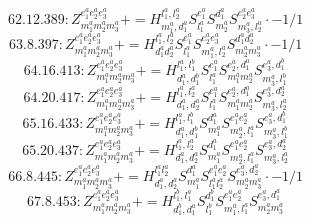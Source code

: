 \documentclass[letterpaper,10pt,fleqn,leqno,onecolumn]{article}
\begin{document}
\begin{equation} \;\;\;\;\;\;  62.12.389: Z^{e_{1}^{a}e_{2}^{a}e_{3}^{a}}_{m_{1}^{a}m_{2}^{a}m_{3}^{a}}+=H^{l_{1}^{a},l_{2}^{a}}_{m_{1}^{a},d_{1}^{a}}S^{e_{1}^{a}}_{l_{1}^{a}}S^{d_{1}^{a}}_{m_{2}^{a}}S^{e_{2}^{a}e_{3}^{a}}_{m_{3}^{a},l_{2}^{a}}\cdot -1/1 \end{equation}
\begin{equation} \;\;\;\;\;\;  63.8.397: Z^{e_{1}^{a}e_{2}^{a}e_{3}^{a}}_{m_{1}^{a}m_{2}^{a}m_{3}^{a}}+=H^{l_{1}^{a},l_{2}^{a}}_{d_{1}^{a}d_{2}^{a}}S^{e_{1}^{a}}_{l_{1}^{a}}S^{e_{2}^{a}e_{3}^{a}}_{m_{1}^{a},l_{2}^{a}}S^{d_{1}^{a}d_{2}^{a}}_{m_{2}^{a}m_{3}^{a}}\cdot -1/1 \end{equation}
\begin{equation} \;\;\;\;\;\;  64.16.413: Z^{e_{1}^{a}e_{2}^{a}e_{3}^{a}}_{m_{1}^{a}m_{2}^{a}m_{3}^{a}}+=H^{l_{1}^{a},l_{1}^{b}}_{d_{1}^{a},d_{1}^{b}}S^{e_{1}^{a}}_{l_{1}^{a}}S^{e_{2}^{a},d_{1}^{a}}_{m_{1}^{a}m_{2}^{a}}S^{e_{3}^{a},d_{1}^{b}}_{m_{3}^{a},l_{1}^{b}} \end{equation}
\begin{equation} \;\;\;\;\;\;  64.20.417: Z^{e_{1}^{a}e_{2}^{a}e_{3}^{a}}_{m_{1}^{a}m_{2}^{a}m_{3}^{a}}+=H^{l_{1}^{a},l_{2}^{a}}_{d_{1}^{a},d_{2}^{a}}S^{e_{1}^{a}}_{l_{1}^{a}}S^{e_{2}^{a},d_{1}^{a}}_{m_{1}^{a}m_{2}^{a}}S^{e_{3}^{a},d_{2}^{a}}_{m_{3}^{a},l_{2}^{a}} \end{equation}
\begin{equation} \;\;\;\;\;\;  65.16.433: Z^{e_{1}^{a}e_{2}^{a}e_{3}^{a}}_{m_{1}^{a}m_{2}^{a}m_{3}^{a}}+=H^{l_{1}^{a},l_{1}^{b}}_{d_{1}^{a},d_{1}^{b}}S^{d_{1}^{a}}_{m_{1}^{a}}S^{e_{1}^{a}e_{2}^{a}}_{m_{2}^{a},l_{1}^{a}}S^{e_{3}^{a},d_{1}^{b}}_{m_{3}^{a},l_{1}^{b}} \end{equation}
\begin{equation} \;\;\;\;\;\;  65.20.437: Z^{e_{1}^{a}e_{2}^{a}e_{3}^{a}}_{m_{1}^{a}m_{2}^{a}m_{3}^{a}}+=H^{l_{1}^{a},l_{2}^{a}}_{d_{1}^{a},d_{2}^{a}}S^{d_{1}^{a}}_{m_{1}^{a}}S^{e_{1}^{a}e_{2}^{a}}_{m_{2}^{a},l_{1}^{a}}S^{e_{3}^{a},d_{2}^{a}}_{m_{3}^{a},l_{2}^{a}} \end{equation}
\begin{equation} \;\;\;\;\;\;  66.8.445: Z^{e_{1}^{a}e_{2}^{a}e_{3}^{a}}_{m_{1}^{a}m_{2}^{a}m_{3}^{a}}+=H^{l_{1}^{a}l_{2}^{a}}_{d_{1}^{a},d_{2}^{a}}S^{d_{1}^{a}}_{m_{1}^{a}}S^{e_{1}^{a}e_{2}^{a}}_{l_{1}^{a}l_{2}^{a}}S^{e_{3}^{a},d_{2}^{a}}_{m_{2}^{a}m_{3}^{a}}\cdot -1/1 \end{equation}
\begin{equation} \;\;\;\;\;\;  67.8.453: Z^{e_{1}^{a}e_{2}^{a}e_{3}^{a}}_{m_{1}^{a}m_{2}^{a}m_{3}^{a}}+=H^{l_{1}^{b},l_{1}^{a}}_{d_{1}^{b},d_{1}^{a}}S^{d_{1}^{b}}_{l_{1}^{b}}S^{e_{1}^{a}e_{2}^{a}}_{m_{1}^{a},l_{1}^{a}}S^{e_{3}^{a},d_{1}^{a}}_{m_{2}^{a}m_{3}^{a}} \end{equation}
\end{document}
